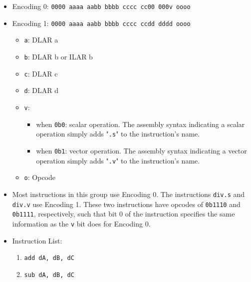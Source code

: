 \documentclass{article}
\begin{document}
		\begin{itemize}
		\item Encoding 0: \texttt{0000 aaaa aabb bbbb  cccc cc00 000v oooo}
		\item Encoding 1: \texttt{0000 aaaa aabb bbbb  cccc ccdd dddd oooo}
			\begin{itemize}
			\item \texttt{a}: DLAR a
			\item \texttt{b}: DLAR b or ILAR b
			\item \texttt{c}: DLAR c
			\item \texttt{d}: DLAR d
			\item \texttt{v}:
				\begin{itemize}
				\item when \texttt{0b0}: scalar operation. The assembly
					syntax indicating a scalar operation simply adds
					"\texttt{.s}" to the instruction's name.
				\item when \texttt{0b1}: vector operation. The assembly
					syntax indicating a vector operation simply adds
					"\texttt{.v}" to the instruction's name.
				\end{itemize}
			\item \texttt{o}: Opcode
			\end{itemize}
		\item Most instructions in this group use Encoding 0.
			The instructions \texttt{div.s} and \texttt{div.v} use Encoding
			1. These two instructions have opcodes of \texttt{0b1110} and
			\texttt{0b1111}, respectively, such that bit 0 of the
			instruction specifies the same information as the \texttt{v}
			bit does for Encoding 0.
		\item Instruction List:
			\begin{enumerate}
			\item \texttt{add dA, dB, dC}
			\item \texttt{sub dA, dB, dC}

\end{enumerate}
\end{itemize}
\end{document}
